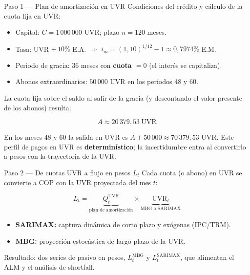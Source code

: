 \documentclass[10pt]{beamer}
\begin{document}
\begin{frame}{Paso 1 — Plan de amortización en UVR}
\small
Condiciones del crédito y cálculo de la cuota fija en UVR:

\begin{itemize}
    \item Capital: \(C = 1\,000\,000\) UVR; plazo \(n=120\) meses.
    \item Tasa: UVR \(+\,10\%\) E.A. \(\Rightarrow\)
          \(i_m = (1{,}10)^{1/12}-1 \approx 0{,}7974\%\) E.M.
    \item Periodo de gracia: 36 meses con \textbf{cuota \(= 0\)} (el interés se capitaliza).
    \item Abonos extraordinarios: \(50\,000\) UVR en los periodos 48 y 60.
\end{itemize}

\vspace{0.1cm}
La cuota fija sobre el saldo al salir de la gracia (y descontando el valor presente
de los abonos) resulta:

\[
A \approx 20\,379{,}53\ \text{UVR}
\]

En los meses 48 y 60 la salida en UVR es \(A + 50\,000 \approx 70\,379{,}53\) UVR.
Este perfil de pagos en UVR es \textbf{determinístico}; la incertidumbre entra al
convertirlo a pesos con la trayectoria de la UVR.
\end{frame}


\begin{frame}{Paso 2 — De cuotas UVR a flujo en pesos \(L_t\)}
\small
Cada cuota (o abono) en UVR se convierte a COP con la UVR proyectada del mes \(t\):

\[
L_t = \underbrace{Q_t^{\text{UVR}}}_{\text{plan de amortización}}
      \times \underbrace{\mathrm{UVR}_t}_{\text{MBG o SARIMAX}}
\]

\begin{itemize}
    \item \textbf{SARIMAX:} captura dinámica de corto plazo y exógenas (IPC/TRM).
    \item \textbf{MBG:} proyección estocástica de largo plazo de la UVR.
\end{itemize}

\vspace{0.15cm}
Resultado: dos series de pasivo en pesos,
\(L_t^{\text{MBG}}\) y \(L_t^{\text{SARIMAX}}\),
que alimentan el ALM y el análisis de shortfall.

\end{frame}
\end{document}

